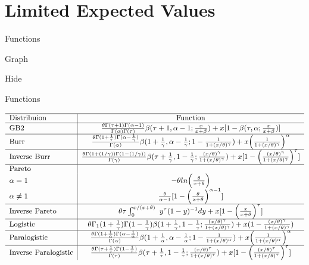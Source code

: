\documentclass[]{book}
\begin{document}
\section{Limited Expected Values}\label{limited-expected-values}

Functions

Graph

\hypertarget{levA}{}
{Hide}

Functions

\[
{\small
\begin{matrix}
\begin{array}{l|c}
\hline
  \text{Distribuion} & \text{Function} \\
\hline
  \text{GB2} & 
  \frac{\theta\Gamma(\tau+1)\Gamma(\alpha-1)}{\Gamma(\alpha)\Gamma(\tau)}\beta(\tau+1,\alpha-1;\frac{x}{x+\beta})+x[1-\beta(\tau,\alpha;\frac{x}{x+\beta})] \\
\hline
  \text{Burr} & \frac{\theta\Gamma(1+\frac{1}{\tau})\Gamma(\alpha-\frac{1}{\gamma})}{\Gamma(\alpha)}\beta(1+\frac{1}{\gamma},\alpha-\frac{1}{\gamma};1-\frac{1}{1+(x/\theta)^\gamma})+x\Big(\frac{1}{1+(x/\theta)^\gamma}\Big)^\alpha \\
\hline
  \text{Inverse Burr} & \frac{\theta\Gamma(1+(1/\gamma))\Gamma(1-(1/\gamma))}{\Gamma(\gamma)}\beta(\tau+\frac{1}{\gamma},1-\frac{1}{\gamma};\frac{(x/\theta)^\gamma}{1+(x/\theta)^\gamma})+x[1-\Big(\frac{(x/\theta)^\gamma}{1+(x/\theta)^\gamma}\Big)^\tau] \\
\hline
  \text{Pareto} & \\
  \alpha=1 & -\theta ln\Big(\frac{\theta}{x+\theta}\Big) \\
  \alpha\neq1 & \frac{\theta}{\alpha-1}[1-\Big(\frac{\theta}{x+\theta}\Big)^{\alpha-1}] \\
\hline
  \text{Inverse Pareto} & \theta\tau\int^{x/(x+\theta)}_0~y^\tau(1-y)^{-1}dy+x[1-\Big(\frac{x}{x+\theta}\Big)^\tau] \\
\hline
  \text{Logistic} & \theta\Gamma_1(1+\frac{1}{\gamma})\Gamma(1-\frac{1}{\gamma})\beta(1+\frac{1}{\gamma},1-\frac{1}{\gamma};\frac{(x/\theta)^\gamma}{1+(x/\theta)^\gamma})+x(1-\frac{(x/\theta)^\gamma}{1+(x/\theta)^\gamma})  \\
\hline
  \text{Paralogistic} & \frac{\theta\Gamma(1+\frac{1}{\alpha})\Gamma(\alpha-\frac{1}{\alpha})}{\Gamma(\alpha)}\beta(1+\frac{1}{\alpha},\alpha-\frac{1}{\alpha};1-\frac{1}{1+(x/\theta)^\alpha})+x\Big(\frac{1}{1+(x/\theta)^\alpha}\Big)^\alpha \\
\hline
  \text{Inverse Paralogistic} & \frac{\theta\Gamma(\tau+\frac{1}{\tau})\Gamma(1-\frac{1}{\tau})}{\Gamma(\tau)}\beta(\tau+\frac{1}{\tau},1-\frac{1}{\tau};\frac{(x/\theta)^\tau}{1+(x/\theta)^\tau})+x[1-\Big(\frac{(x/\theta)^\tau}{1+(x/\theta)^\tau}\Big)^\tau] \\

\end{array}
\end{matrix}}\]
\end{document}
